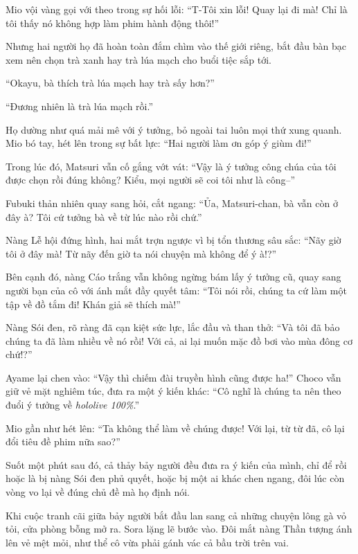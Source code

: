 \documentclass[../main.tex]{subfiles}
\begin{document}

Mio vội vàng gọi với theo trong sự hối lỗi: ``T-Tôi xin lỗi! Quay lại đi mà! Chỉ là tôi thấy nó không hợp làm phim hành động thôi!''

Nhưng hai người họ đã hoàn toàn đắm chìm vào thế giới riêng, bắt đầu bàn bạc xem nên chọn trà xanh hay trà lúa mạch cho buổi tiệc sắp tới.

``Okayu, bà thích trà lúa mạch hay trà sấy hơn?''

``Đương nhiên là trà lúa mạch rồi.''

Họ dường như quá mải mê với ý tưởng, bỏ ngoài tai luôn mọi thứ xung quanh. Mio bó tay, hét lên trong sự bất lực: ``Hai người làm ơn góp ý giùm đi!''

Trong lúc đó, Matsuri vẫn cố gắng vớt vát: ``Vậy là ý tưởng công chúa của tôi được chọn rồi đúng không? Kiểu, mọi người sẽ coi tôi như là công--''

Fubuki thản nhiên quay sang hỏi, cắt ngang: ``Ủa, Matsuri-chan, bà vẫn còn ở đây à? Tôi cứ tưởng bà về từ lúc nào rồi chứ.''

Nàng Lễ hội đứng hình, hai mắt trợn ngược vì bị tổn thương sâu sắc: ``Nãy giờ tôi ở đây mà! Từ nãy đến giờ ta nói chuyện mà không để ý à!?''

Bên cạnh đó, nàng Cáo trắng vẫn không ngừng bám lấy ý tưởng cũ, quay sang người bạn của cô với ánh mắt đầy quyết tâm: ``Tôi nói rồi, chúng ta cứ làm một tập về đồ tắm đi! Khán giả sẽ thích mà!''

Nàng Sói đen, rõ ràng đã cạn kiệt sức lực, lắc đầu và than thở: ``Và tôi đã bảo chúng ta đã làm nhiều về nó rồi! Với cả, ai lại muốn mặc đồ bơi vào mùa đông cơ chứ!?''

Ayame lại chen vào: ``Vậy thì chiếm đài truyền hình cũng được ha!'' Choco vẫn giữ vẻ mặt nghiêm túc, đưa ra một ý kiến khác: ``Cô nghĩ là chúng ta nên theo đuổi ý tưởng về \textit{hololive 100\%}.''

Mio gần như hét lên: ``Ta không thể làm về chúng được! Với lại, từ từ đã, cô lại đổi tiêu đề phim nữa sao?''

Suốt một phút sau đó, cả thảy bảy người đều đưa ra ý kiến của mình, chỉ để rồi hoặc là bị nàng Sói đen phủ quyết, hoặc bị một ai khác chen ngang, đôi lúc còn vòng vo lại về đúng chủ đề mà họ định nói.

Khi cuộc tranh cãi giữa bảy người bắt đầu lan sang cả những chuyện lông gà vỏ tỏi, cửa phòng bỗng mở ra. Sora lặng lẽ bước vào. Đôi mắt nàng Thần tượng ánh lên vẻ mệt mỏi, như thể cô vừa phải gánh vác cả bầu trời trên vai.
\end{document}

